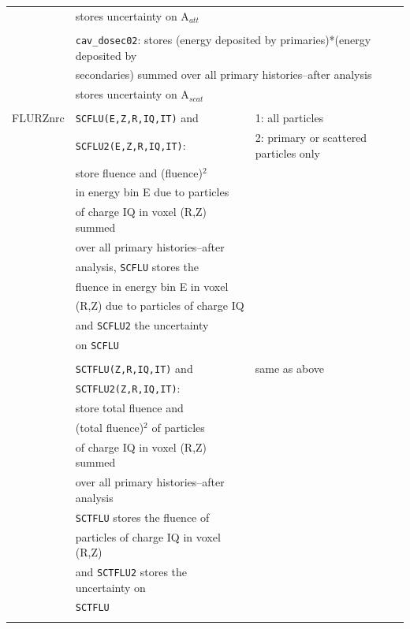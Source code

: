 \documentclass[12pt,twoside]{article}  %
\begin{document}
\begin{longtable}{lll}
         & \multicolumn{2}{l}{stores uncertainty on A$_{att}$}\\
         &&\\
         & \multicolumn{2}{l}{{\tt cav\_dosec02}: stores (energy deposited by primaries)*(energy deposited by}\\
         & \multicolumn{2}{l}{secondaries) summed over all primary histories--after analysis}\\
         & \multicolumn{2}{l}{stores uncertainty on A$_{scat}$}\\
         &          &\\
FLURZnrc & {\tt SCFLU(E,Z,R,IQ,IT)} and & 1: all particles\\
         & {\tt SCFLU2(E,Z,R,IQ,IT)}: & 2: primary or scattered particles only\\
         & store fluence and (fluence)$^2$ &\\
         & in energy bin E due to particles &\\
         & of charge IQ in voxel (R,Z) summed &\\
         & over all primary histories--after &\\
         & analysis, {\tt SCFLU} stores the &\\
         & fluence in energy bin E in voxel &\\
         & (R,Z) due to particles of charge IQ&\\
         & and {\tt SCFLU2} the uncertainty &\\
         & on {\tt SCFLU} &\\
         &&\\
         & {\tt SCTFLU(Z,R,IQ,IT)} and & same as above\\
         & {\tt SCTFLU2(Z,R,IQ,IT)}: &\\
         & store total fluence and &\\
         & (total fluence)$^2$ of particles &\\
         & of charge IQ in voxel (R,Z) summed &\\
         & over all primary histories--after analysis&\\
         & {\tt SCTFLU} stores the fluence of &\\
         & particles of charge IQ in voxel (R,Z) &\\
         & and {\tt SCTFLU2} stores the uncertainty on&\\
         & {\tt SCTFLU}&\\
         &&\\  

\end{longtable}
\end{document}
